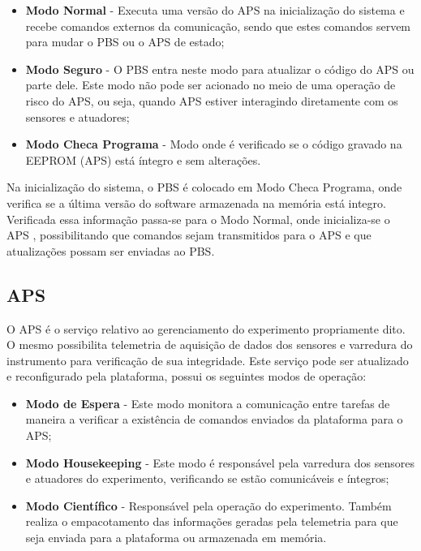 \documentclass[journal,a4paper,oneside,twocolumn]{IEEEtran}
\begin{document}
		\begin{itemize}
			\item \textbf{Modo Normal }- Executa uma versão do APS na inicialização do sistema e recebe 	comandos externos da comunicação, sendo que estes comandos servem para mudar o PBS ou	o APS de estado;
						
			\item \textbf{Modo Seguro} - O PBS entra neste modo para atualizar o código do APS ou parte dele. Este modo não pode ser acionado no meio de uma operação de risco do APS, ou seja, quando APS estiver interagindo diretamente com os sensores e atuadores;
			
			\item \textbf{Modo Checa Programa} - Modo onde é verificado se o código gravado na EEPROM (APS) está íntegro e sem alterações.
		\end{itemize}

	Na inicialização do sistema, o PBS é colocado em Modo Checa Programa, onde verifica se a última versão do software armazenada na memória está integro. Verificada essa informação passa-se para o Modo Normal, onde inicializa-se o APS , possibilitando que comandos sejam transmitidos para o APS e que atualizações possam ser enviadas ao PBS.

\subsection{APS}		

	O APS é o serviço relativo ao gerenciamento do experimento propriamente dito. O mesmo possibilita telemetria de aquisição de dados dos sensores e varredura do instrumento para verificação de sua integridade. Este serviço pode ser atualizado e reconfigurado pela plataforma, possui os seguintes modos de operação:

	\begin{itemize}
		\item \textbf{Modo de Espera} - Este modo monitora a comunicação entre tarefas de maneira a verificar a existência de comandos enviados da plataforma para o APS;
		
		\item \textbf{Modo Housekeeping} - Este modo é responsável pela varredura dos sensores e atuadores do experimento, verificando se estão comunicáveis e íntegros;
		
		\item \textbf{Modo Científico} - Responsável pela operação do experimento. Também realiza o empacotamento das informações geradas pela telemetria para que seja enviada para a plataforma ou armazenada em memória.
	\end{itemize}
	
\end{document}

